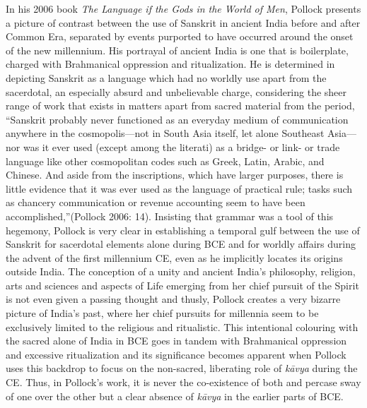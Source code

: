 In his 2006 book \textit{The Language if the Gods in the World of Men}, Pollock presents a picture of contrast between the use of Sanskrit in ancient India before and after Common Era, separated by events purported to have occurred around the onset of the new millennium. His portrayal of ancient India is one that is boilerplate, charged with Brahmanical oppression and ritualization. He is determined in depicting Sanskrit as a language which had no worldly use apart from the sacerdotal, an especially absurd and unbelievable charge, considering the sheer range of work that exists in matters apart from sacred material from the period, “Sanskrit probably never functioned as an everyday medium of communication anywhere in the cosmopolis—not in South Asia itself, let alone Southeast Asia— nor was it ever used (except among the literati) as a bridge- or link- or trade language like other cosmopolitan codes such as Greek, Latin, Arabic, and Chinese. And aside from the inscriptions, which have larger purposes, there is little evidence that it was ever used as the language of practical rule; tasks such as chancery communication or revenue accounting seem to have been accomplished,”(Pollock 2006: 14). Insisting that grammar was a tool of this hegemony, Pollock is very clear in establishing a temporal gulf between the use of Sanskrit for sacerdotal elements alone during BCE and for worldly affairs during the advent of the first millennium CE, even as he implicitly locates its origins outside India. The conception of a unity and ancient India’s philosophy, religion, arts and sciences and aspects of Life emerging from her chief pursuit of the Spirit is not even given a passing thought and thusly, Pollock creates a very bizarre picture of India’s past, where her chief pursuits for millennia seem to be exclusively limited to the religious and ritualistic. This intentional colouring with the sacred alone of India in BCE goes in tandem with Brahmanical oppression and excessive ritualization and its significance becomes apparent when Pollock uses this backdrop to focus on the non-sacred, liberating role of \textit{kāvya} during the CE. Thus, in Pollock’s work, it is never the co-existence of both and percase sway of one over the other but a clear absence of \textit{kāvya} in the earlier parts of BCE.


